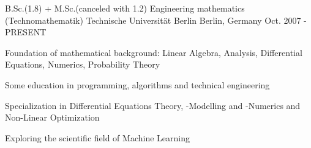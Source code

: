 


\begin{cventries}


\cventry
{B.Sc.(1.8) + M.Sc.(canceled with 1.2) Engineering mathematics (Technomathematik)} %
{Technische Universität Berlin} %
{Berlin, Germany} %
{Oct. 2007 - PRESENT} %
{ %
\begin{cvitems}
\item {Foundation of mathematical background: Linear Algebra, Analysis, Differential Equations, Numerics, Probability Theory}
\item {Some education in programming, algorithms and technical engineering}
\item {Specialization in Differential Equations Theory, -Modelling and -Numerics and Non-Linear Optimization}
\item{Exploring the scientific field of Machine Learning}
\end{cvitems}
}


\end{cventries}